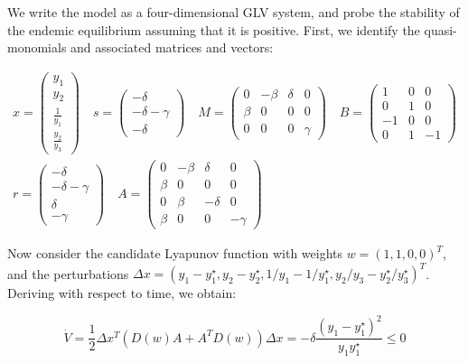 \documentclass{article}
\begin{document}
We write the model as a four-dimensional GLV system, and probe the
stability of the endemic equilibrium assuming that it is positive.
First, we identify the quasi-monomials and associated matrices and
vectors:

\begin{equation}
\begin{aligned}
x = \begin{pmatrix}
y_1\\
y_2\\
\frac{1}{y_1}\\
\frac{y_2}{y_3}
\end{pmatrix}
\quad
s = \begin{pmatrix}
-\delta \\
-\delta - \gamma \\
-\delta
\end{pmatrix}
\quad
M = \begin{pmatrix}
0 & -\beta & \delta & 0\\
\beta & 0 & 0 & 0 \\
0 & 0 & 0 & \gamma
\end{pmatrix}
\quad
B = \begin{pmatrix}
1 & 0 & 0\\
0 & 1 & 0\\
-1 & 0 & 0\\
0 & 1 & -1
\end{pmatrix}
\\
r = \begin{pmatrix}
-\delta \\
-\delta - \gamma \\
\delta\\
-\gamma
\end{pmatrix}
\quad 
A = \begin{pmatrix}
0 & -\beta & \delta & 0 \\
\beta & 0 & 0 & 0\\
0 & \beta & -\delta & 0 \\
\beta & 0 & 0 & -\gamma
\end{pmatrix}
\end{aligned}
\end{equation}

Now consider the candidate Lyapunov function with weights
\(w = (1,1,0,0)^T\), and the perturbations
\(\Delta x = (y_1 - y_1^\star, y_2 - y_2^\star, 1/y_1 - 1 / y_1^\star, y_2 / y_3 - y_2^\star / y_3^\star)^T\).
Deriving with respect to time, we obtain:

\begin{equation}
\dot{V} = \frac{1}{2} \Delta x^T (D(w) A + A^T D(w)) \Delta x =  - \delta \frac{(y_1 - y_1^\star)^2}{y_1 y_1^\star} \leq 0
\end{equation}
\end{document}
